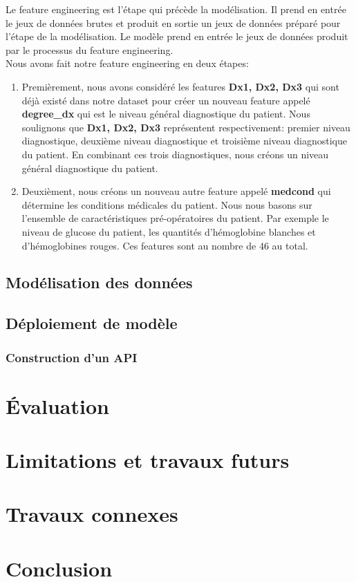 \documentclass[12pt, french]{article}
\begin{document}
Le feature engineering est l'étape qui précède la modélisation. Il prend en entrée le jeux de données brutes et produit en sortie un jeux de données préparé pour l'étape de la modélisation. Le modèle prend en entrée le jeux de données produit par le processus du feature engineering. \\ 

Nous avons fait notre feature engineering en deux étapes: 
\begin{enumerate}
\item Premièrement, nous avons considéré les features \textbf{Dx1, Dx2, Dx3 } qui sont déjà existé dans notre dataset pour créer un nouveau feature appelé \textbf{degree\_dx} qui est le niveau général diagnostique du patient. Nous soulignons que  \textbf{Dx1, Dx2, Dx3} représentent respectivement: premier niveau diagnostique, deuxième niveau diagnostique et troisième niveau diagnostique du patient. En combinant ces trois diagnostiques, nous créons un niveau général  diagnostique du patient. 
\item Deuxièment, nous créons un nouveau autre feature appelé \textbf{medcond} qui détermine les conditions médicales du patient. Nous nous basons sur l'ensemble de caractéristiques pré-opératoires du patient. Par exemple le niveau de glucose du patient, les quantités d'hémoglobine blanches et d'hémoglobines rouges. Ces features sont au nombre de 46 au total.
\end{enumerate}


 


\subsection{Modélisation des données}
\subsection{Déploiement de modèle}
\subsubsection{Construction d'un API}



\newpage

\section{Évaluation}


\newpage

\section{Limitations et travaux futurs}

\newpage

\section{Travaux connexes}


\newpage

\section{Conclusion}
	
\end{document}
